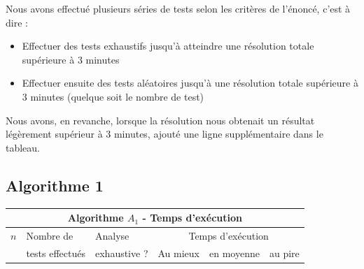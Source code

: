 Nous avons effectué plusieurs séries de tests selon les critères de l'énoncé, c'est à dire :
\begin{itemize}
 \item Effectuer des tests exhaustifs jusqu'à atteindre une résolution totale supérieure à 3 minutes
 \item Effectuer ensuite des tests aléatoires jusqu'à une résolution totale supérieure à 3 minutes (quelque soit le nombre de test)
\end{itemize}
Nous avons, en revanche, lorsque la résolution nous obtenait un résultat légèrement supérieur à 3 minutes, ajouté une ligne supplémentaire dans le tableau.
\subsection{Algorithme 1}
\begin{table}[p]
{%
\begin{center}
\begin{tabular}{||p{1cm}||p{2.5cm}|p{2.5cm}|p{2.5cm}|p{2.5cm}|p{2.5cm}||}
\hline\hline
\multicolumn{6}{||c||}{Algorithme $A_1$ - Temps d'exécution}\\\hline\hline
$n$ & Nombre de & Analyse& \multicolumn{3}{c||}{Temps d'exécution}\\
& tests effectués & exhaustive ?  &Au mieux&en moyenne&au pire\\\hline\hline



\end{tabular}
\end{center}}
\end{table}
